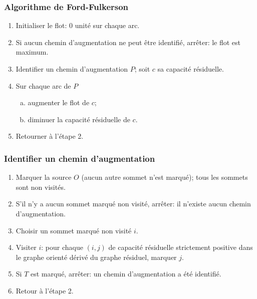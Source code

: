 \documentclass[usepdftitle=false, aspectratio=169]{beamer}
\begin{document}
\begin{frame}
\frametitle{Algorithme de Ford-Fulkerson}

\begin{enumerate}
	\item 
	Initialiser le flot: 0 unité sur chaque arc.
	\item
	Si aucun chemin d'augmentation ne peut être identifié, arrêter: le flot est maximum.
	\item
	Identifier un chemin d'augmentation $P$; soit $c$ sa capacité résiduelle.
	\item
	Sur chaque arc de $P$
	\begin{enumerate}[(a)]
		\item
		augmenter le flot de $c$;
		\item
		diminuer la capacité résiduelle de $c$.
	\end{enumerate}
	\item
	Retourner à l'étape 2.
\end{enumerate}

\end{frame}

\begin{frame}
\frametitle{Identifier un chemin d'augmentation}

\begin{enumerate}
	\item
	Marquer la source $O$ (aucun autre sommet n'est marqué); tous les sommets sont non visités.
	\item
	S'il n'y a aucun sommet marqué non visité, arrêter: il n'existe aucun chemin d'augmentation.
	\item
	Choisir un sommet marqué non visité $i$.
	\item
	Visiter $i$: pour chaque $(i,j)$ de capacité résiduelle strictement positive dans le graphe orienté dérivé du graphe résiduel, marquer $j$.
	\item
	Si $T$ est marqué, arrêter: un chemin d'augmentation a été identifié.
	\item
	Retour à l'étape 2.
\end{enumerate}

\end{frame}
\end{document}
